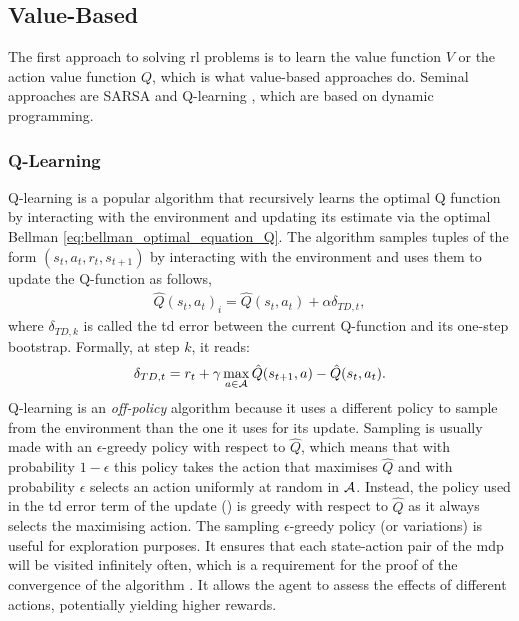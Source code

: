 \subsection{Value-Based}
The first approach to solving \gls{rl} problems is to learn the value function $V$ or the action value function $Q$, which is what value-based approaches do. 
Seminal approaches are SARSA \cite{rummery1994line} and Q-learning \cite{watkins1989learning}, which are based on dynamic programming.

\subsubsection{Q-Learning}
Q-learning \cite{watkins1989learning} is a popular algorithm that recursively learns the optimal Q function by interacting with the environment and updating its estimate via the optimal Bellman \cref{eq:bellman_optimal_equation_Q}.
The algorithm samples tuples of the form $(s_t,a_t,r_t,s_{t+1})$ by interacting with the environment and uses them to update the Q-function as follows,
\begin{align}
\label{eq:update_q_learning}
    \hat Q(s_t, a_t)_i = \hat Q(s_t, a_t) + \alpha \delta_{TD,t},
\end{align}
where $\delta_{TD,k}$ is called the \gls{td} error between the current Q-function and its one-step bootstrap. Formally, at step $k$, it reads:
\begin{align}
\label{eq:td_error_q_learning}
    \delta_{TD,t} = r_t+\gamma \max_{a\in\mathcal{A}} \hat Q(s_{t+1}, a) -\hat Q(s_t, a_t).
\end{align}
Q-learning is an \emph{off-policy} algorithm because it uses a different policy to sample from the environment than the one it uses for its update. 
Sampling is usually made with an $\epsilon$-greedy policy with respect to $\hat{Q}$, which means that with probability $1-\epsilon$ this policy takes the action that maximises $\hat{Q}$ and with probability $\epsilon$ selects an action uniformly at random in $\mathcal{A}$. Instead, the policy used in the \gls{td} error term of the update () is greedy with respect to $\hat Q$ as it always selects the maximising action. 
The sampling $\epsilon$-greedy policy (or variations) is useful for exploration purposes. 
It ensures that each state-action pair of the \gls{mdp} will be visited infinitely often, which is a requirement for the proof of the convergence of the algorithm \cite{watkins1992q}.
It allows the agent to assess the effects of different actions, potentially yielding higher rewards.

